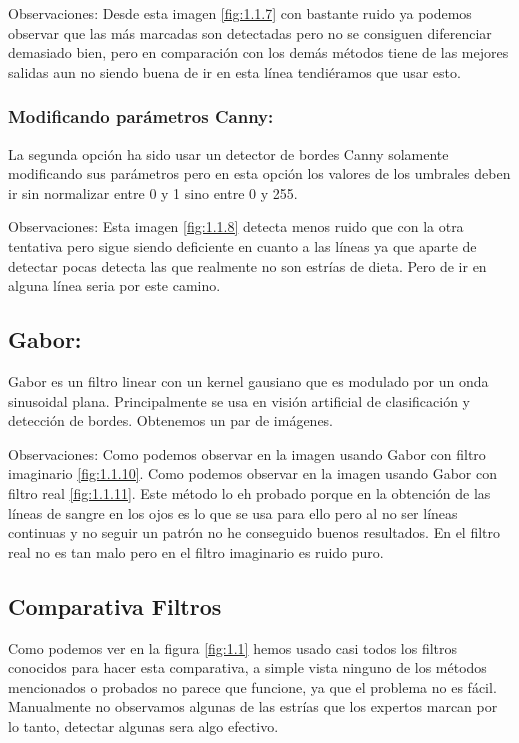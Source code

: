 Observaciones:
Desde esta imagen \ref{fig:1.1.7} con bastante ruido ya podemos observar que las más marcadas son detectadas pero no se consiguen diferenciar demasiado bien, pero en comparación con los demás métodos tiene de las mejores salidas aun no siendo buena de ir en esta línea tendiéramos que usar esto.

\subsubsection{Modificando parámetros Canny:}

La segunda opción ha sido usar un detector de bordes Canny solamente modificando sus parámetros pero en esta opción los valores de los umbrales deben ir sin normalizar entre 0 y 1 sino entre 0 y 255.


Observaciones:
Esta imagen \ref{fig:1.1.8} detecta menos ruido que con la otra tentativa pero sigue siendo deficiente en cuanto a las líneas ya que aparte de detectar pocas detecta las que realmente no son estrías de dieta. Pero de ir en alguna línea seria por este camino.



\subsection{Gabor:}

Gabor \cite{wiki:Gabor} es un filtro linear con un kernel gausiano  que es modulado por un onda sinusoidal plana. Principalmente se usa en visión artificial de clasificación y detección de bordes.
Obtenemos un par de imágenes.



Observaciones:
Como podemos observar en la imagen usando Gabor con filtro imaginario \ref{fig:1.1.10}.
Como podemos observar en la imagen usando Gabor con filtro real \ref{fig:1.1.11}.
Este método lo eh probado porque en la obtención de las líneas de sangre en los ojos es lo que se usa para ello pero al no ser líneas continuas y no seguir un patrón no he conseguido buenos resultados. En el filtro real no es tan malo pero en el filtro imaginario es ruido puro.
\subsection{Comparativa Filtros}
Como podemos ver en la figura \ref{fig:1.1} hemos usado casi todos los filtros conocidos para hacer esta comparativa, a simple vista ninguno de los métodos mencionados o probados no parece que funcione, ya que el problema no es fácil.
Manualmente no observamos algunas de las estrías que los expertos marcan por lo tanto, detectar algunas sera algo efectivo.


